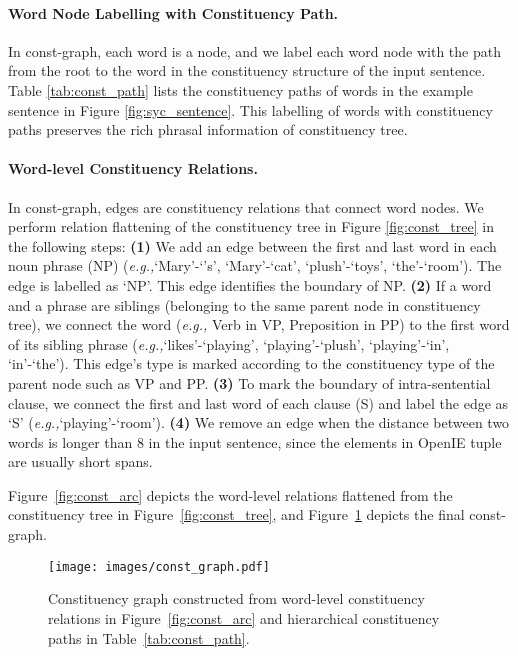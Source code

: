 \documentclass[11pt]{article}
\newcommand{\eg}{\emph{e.g.,}\xspace}
\begin{document}
\paragraph{Word Node Labelling with Constituency Path.}

In const-graph, each word is a node, and we label each word node with the path from the root to the word in the constituency structure of the input sentence. Table \ref{tab:const_path} lists the constituency paths of words in the example sentence in Figure \ref{fig:syc_sentence}. This labelling of words with constituency paths preserves the rich phrasal information of constituency tree.

\paragraph{Word-level Constituency Relations.}

In const-graph, edges are constituency relations that connect word nodes.
We perform relation flattening of the constituency tree in Figure \ref{fig:const_tree} in the following steps:  
\textbf{(1)} We add an edge between the first and last word in each noun phrase (NP) (\eg `Mary'-`'s', `Mary'-`cat', `plush'-`toys', `the'-`room'). The edge is labelled as `NP'. This edge identifies the boundary of NP.
\textbf{(2)} If a word and a phrase are siblings (belonging to the same parent node in constituency tree), we connect the word (\eg Verb in VP, Preposition in PP) to the first word of its sibling phrase (\eg `likes'-`playing', `playing'-`plush', `playing'-`in', `in'-`the').
This edge's type is marked according to the constituency type of the parent node such as VP and PP.
\textbf{(3)} To mark the boundary of intra-sentential clause, we connect the first and last word of each clause (S) and label the edge as `S' (\eg `playing'-`room'). 
\textbf{(4)} We remove an edge when the distance between two words is longer than 8 in the input sentence, since the elements in OpenIE tuple are usually short spans.


Figure~\ref{fig:const_arc} depicts the word-level relations flattened from the constituency tree in Figure~\ref{fig:const_tree}, and Figure~\ref{fig:const_graph} depicts the final const-graph.


\begin{figure}
   \centering
   \texttt{[image: images/const\_graph.pdf]}
   \caption{Constituency graph constructed from word-level constituency relations in Figure~\ref{fig:const_arc} and hierarchical constituency paths in Table~\ref{tab:const_path}.}
   \label{fig:const_graph}
\end{figure}
\end{document}
